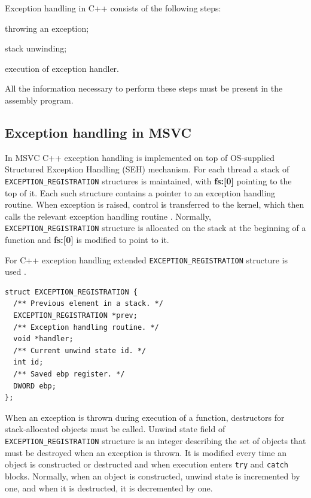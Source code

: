 \documentclass[times, 10pt,twocolumn]{article}
\renewcommand{\~}{{\raise.35ex\hbox{$\scriptstyle\sim$}}}
\newcounter{xcounter}
\renewenvironment{enumerate}{
    \begin{list}{\arabic{xcounter})}{\usecounter{xcounter} \itemsep=-\parsep}
}{
	\end{list}
}
\begin{document}
Exception handling in C++
consists of the following steps:

\begin{enumerate}
\item throwing an exception;
\item stack unwinding;
\item execution of exception handler.
\end{enumerate}

All the information necessary to perform these steps must be present in the
assembly program.



\quad
\subsection{Exception handling in MSVC}
In MSVC C++ exception handling is implemented on top of OS-supplied Structured
Exception Handling (SEH) mechanism. For each thread a stack of
\lstinline{EXCEPTION_REGISTRATION} structures is maintained, with \textbf{fs:[0]} pointing to
the top of it. Each such structure contains a pointer to an exception handling routine.
When exception is raised, control is transferred to the kernel, which then calls the relevant
exception handling routine \cite{pietrek97}. Normally, \lstinline{EXCEPTION_REGISTRATION}
structure is allocated on the stack at the beginning of a function and \textbf{fs:[0]}
is modified to point to it.

For C++ exception handling extended \lstinline{EXCEPTION_REGISTRATION} structure is used \cite{skochinsky06e}.
{
\lstset{basicstyle=\small}
\begin{lstlisting}
struct EXCEPTION_REGISTRATION {
  /** Previous element in a stack. */
  EXCEPTION_REGISTRATION *prev;
  /** Exception handling routine. */
  void *handler;
  /** Current unwind state id. */
  int id;
  /** Saved ebp register. */
  DWORD ebp;
};
\end{lstlisting}
}

When an exception is thrown during execution of a function, destructors for
stack-allocated objects must be called. Unwind state field of
\lstinline{EXCEPTION_REGISTRATION} structure is an integer describing the set of
objects that must be destroyed when an exception is thrown. It is modified
every time an object is constructed or destructed and when execution enters
\lstinline{try} and \lstinline{catch} blocks.
Normally, when an object is constructed, unwind state is incremented by one,
and when it is destructed, it is decremented by one.
\end{document}
